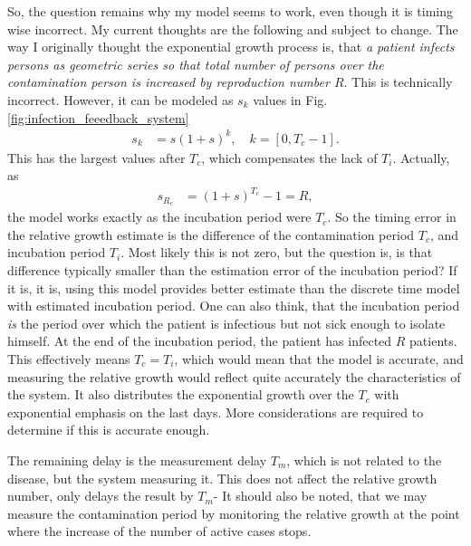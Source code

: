 So, the
question remains why my model seems to work, even though it is timing wise
incorrect. My current thoughts are the following and subject to change. The
way I originally thought the exponential growth process is, that \emph{a
    patient infects persons as geometric series so that total number of persons over the
contamination person is increased by reproduction number $R$}. This is technically incorrect.
However, it can be modeled as $s_k$  values in Fig. \ref{fig:infection_feeedback_system}
\begin{align}
    s_k&=s\left(1+s\right)^k, \quad k=\left[0,T_c-1\right].
\end{align}
This has the largest values after $T_c$, which compensates the lack of $T_i$.
Actually, as  
\begin{align}
    s_{R_c}&=\left(1+s\right)^{T_c}-1=R,
\end{align}
the model works exactly as the incubation period were $T_c$. So the timing
error in the relative growth estimate is the difference of the contamination
period $T_c$, and incubation period $T_i$. Most likely this is not zero, but
the question is, is that difference typically smaller than the estimation
error of the incubation period? If it is, it is, using this model provides
better estimate than the discrete time model with estimated
incubation period. One can also think, that the incubation period \emph{is}
the period over which the patient is infectious but not sick enough to isolate
himself. At the end of the incubation period, the patient has infected $R$
patients. This effectively means $T_c=T_i$, which would mean that the model is
accurate, and measuring the relative growth would reflect quite accurately the
characteristics of the system. It also distributes the exponential growth
over the $T_c$ with exponential emphasis on the last days. More considerations
are required to determine if this is accurate enough.

The remaining delay is the measurement delay
$T_m$, which is not related to the disease, but the system measuring it. This
does not affect the relative growth number, only delays the result by $T_m$-
It should also be noted, that we may measure the contamination period by
monitoring the relative growth at the point where the increase of the number
of active cases stops. 

